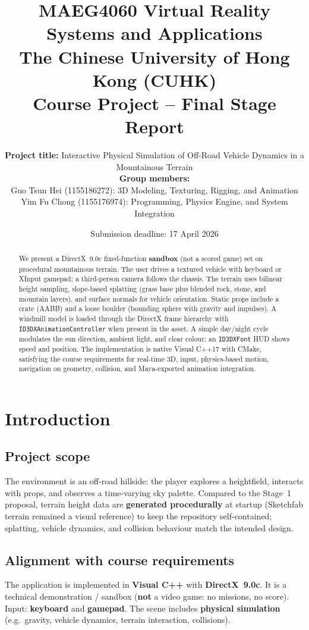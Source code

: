 \documentclass[11pt,a4paper]{article}
\title{%
  MAEG4060 Virtual Reality Systems and Applications\\
  \large The Chinese University of Hong Kong (CUHK)\\
  \large Course Project -- Final Stage Report}
\author{%
  \parbox{0.92\linewidth}{\centering
  \textbf{Project title:} Interactive Physical Simulation of Off-Road Vehicle Dynamics in a Mountainous Terrain\\[0.75em]
  \textbf{Group members:}\\[0.35em]
  Guo Tsun Hei (1155186272): 3D Modeling, Texturing, Rigging, and Animation\\
  Yim Fu Chong (1155176974): Programming, Physics Engine, and System Integration}}
\date{Submission deadline: 17 April 2026}
\begin{document}
\maketitle

\begin{abstract}
\noindent
We present a DirectX~9.0c fixed-function \textbf{sandbox} (not a scored game) set on procedural mountainous terrain. The user drives a textured vehicle with keyboard or XInput gamepad; a third-person camera follows the chassis. The terrain uses bilinear height sampling, slope-based splatting (grass base plus blended rock, stone, and mountain layers), and surface normals for vehicle orientation. Static props include a crate (AABB) and a loose boulder (bounding sphere with gravity and impulses). A windmill model is loaded through the DirectX frame hierarchy with \texttt{ID3DXAnimationController} when present in the asset. A simple day/night cycle modulates the sun direction, ambient light, and clear colour; an \texttt{ID3DXFont} HUD shows speed and position. The implementation is native Visual C++17 with CMake, satisfying the course requirements for real-time 3D, input, physics-based motion, navigation on geometry, collision, and Maya-exported animation integration.
\end{abstract}

\tableofcontents
\newpage

\section{Introduction}
\label{sec:intro}

\subsection{Project scope}
The environment is an off-road hillside: the player explores a heightfield, interacts with props, and observes a time-varying sky palette. Compared to the Stage~1 proposal, terrain height data are \textbf{generated procedurally} at startup (Sketchfab terrain remained a visual reference) to keep the repository self-contained; splatting, vehicle dynamics, and collision behaviour match the intended design.

\subsection{Alignment with course requirements}
The application is implemented in \textbf{Visual C++} with \textbf{DirectX~9.0c}. It is a technical demonstration / sandbox (\textbf{not} a video game: no missions, no score). Input: \textbf{keyboard} and \textbf{gamepad}. The scene includes \textbf{physical simulation} (e.g.\ gravity, vehicle dynamics, terrain interaction, collisions).
\end{document}
